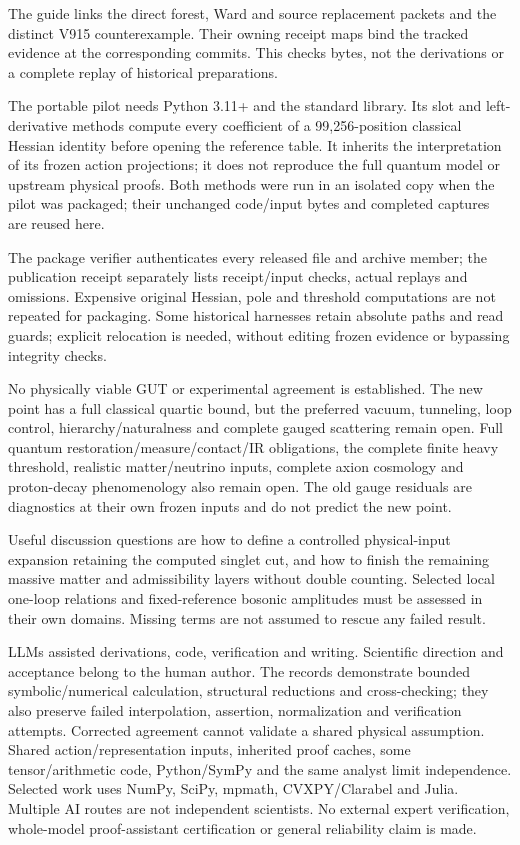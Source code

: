 \documentclass[10pt,letterpaper]{article}
\newcommand{\sect}[1]{\vspace{5pt}{\large\bfseries\color{ink}#1}\par}
\begin{document}
The guide links the direct forest, Ward and source replacement packets
and the distinct V915 counterexample. Their owning receipt maps bind the
tracked evidence at the corresponding commits. This checks bytes, not
the derivations or a complete replay of historical preparations.

\sect{What readers can rerun}
The portable pilot needs Python 3.11+ and the standard library. Its slot and
left-derivative methods compute every coefficient of a 99,256-position
classical Hessian identity before opening the reference table. It inherits
the interpretation of its frozen action projections; it does not reproduce
the full quantum model or upstream physical proofs. Both methods were run in an isolated copy when the pilot was packaged;
their unchanged code/input bytes and completed captures are reused here.

The package verifier authenticates every released file and archive member;
the publication receipt separately lists receipt/input checks, actual replays
and omissions. Expensive original Hessian, pole and threshold computations
are not repeated for packaging. Some historical harnesses retain absolute
paths and read guards; explicit relocation is needed, without editing
frozen evidence or bypassing integrity checks.

\newpage
\sect{14. Remaining obligations and AI assistance}
No physically viable GUT or experimental agreement is established. The new
point has a full classical quartic bound, but the preferred vacuum, tunneling,
loop control, hierarchy/naturalness and complete gauged scattering remain
open. Full quantum restoration/measure/contact/IR obligations, the complete finite heavy
threshold, realistic matter/neutrino inputs, complete axion cosmology and
proton-decay phenomenology also remain open. The old gauge residuals are
diagnostics at their own frozen inputs and do not predict the new point.

Useful discussion questions are how to define a controlled physical-input
expansion retaining the computed singlet cut, and how to finish the remaining
massive matter and admissibility layers without double counting. Selected local one-loop relations and fixed-reference bosonic amplitudes
must be assessed in their own domains. Missing terms are not assumed to rescue any failed result.

LLMs assisted derivations, code, verification and writing. Scientific direction
and acceptance belong to the human author. The records demonstrate bounded
symbolic/numerical calculation, structural reductions and cross-checking;
they also preserve failed interpolation, assertion, normalization and
verification attempts. Corrected agreement cannot validate a shared physical
assumption. Shared action/representation inputs, inherited proof caches,
some tensor/arithmetic code, Python/SymPy and the same analyst limit
independence. Selected work uses NumPy, SciPy, mpmath, CVXPY/Clarabel and
Julia. Multiple AI routes are not independent scientists. No external expert
verification, whole-model proof-assistant certification or general reliability
claim is made.
\end{document}
